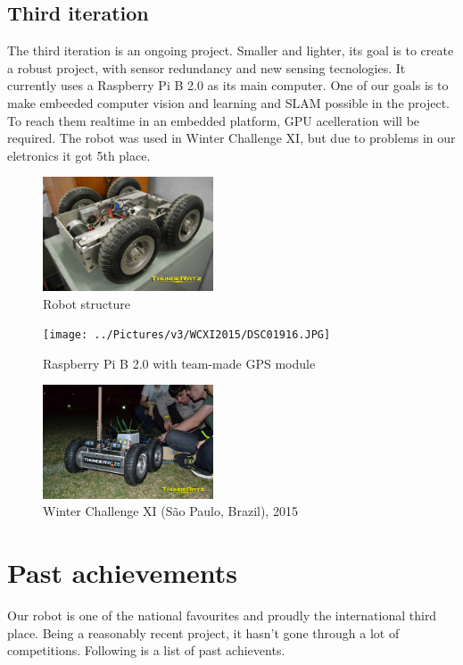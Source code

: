 \documentclass[conference]{IEEEtran}
\begin{document}
\subsection{Third iteration}
The third iteration is an ongoing project. Smaller and lighter, its goal is to
create a robust project, with sensor redundancy and new sensing tecnologies.
It currently uses a Raspberry Pi B 2.0 as its main computer. One of our goals is
to make embeeded computer vision and learning and SLAM possible in the project.
To reach them realtime in an embedded platform, GPU acelleration will be required.
The robot was used in Winter Challenge XI, but due to problems in our eletronics
it got 5th place.

\begin{figure}[H]
    \centering
    \includegraphics[width=0.45\textwidth]{../Pictures/v3/WCXI2015/1404454_850450764990318_6911866873946202760_o.jpg}
    \caption{Robot structure}
\end{figure}

\begin{figure}[H]
    \centering
    \texttt{[image: ../Pictures/v3/WCXI2015/DSC01916.JPG]}
    \caption{Raspberry Pi B 2.0 with team-made GPS module}
\end{figure}

\begin{figure}[H]
    \centering
    \includegraphics[width=0.45\textwidth]{../Pictures/v3/WCXI2015/11402892_850967411605320_3887305866160117339_o.jpg}
    \caption{Winter Challenge XI (São Paulo, Brazil), 2015}
\end{figure}


\section{Past achievements} \label{past-achievements}
Our robot is one of the national favourites and proudly the international
third place. Being a reasonably recent project, it hasn't gone through a lot of
competitions. Following is a list of past achievents.
\end{document}
